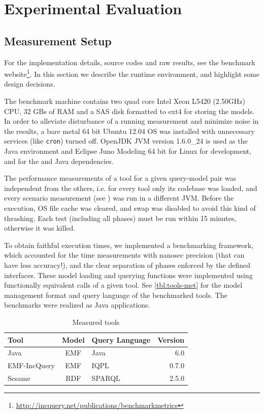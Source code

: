 \section{Experimental Evaluation}
\label{sec:eval}
% 

\subsection{Measurement Setup}

For the implementation details, source codes and raw results, see the
benchmark website\footnote{\url{http://incquery.net/publications/benchmarkmetrics}}. In this
section we describe the runtime environment, and highlight some design
decisions.

The benchmark machine contains two quad core Intel Xeon L5420 (2.50GHz) CPU, 32
GBs of RAM and a SAS disk formatted to ext4 for storing the models. In order to
alleviate disturbance of a running measurement and minimize noise in the results,
a bare metal 64 bit Ubuntu 12.04 OS was installed with unnecessary services
(like \texttt{cron}) turned off. OpenJDK JVM version 1.6.0\_24 is used as the Java
environment and Eclipse Juno Modeling 64 bit for Linux for development, and for
the \incquery{} and Java dependencies.

The performance measurements of a tool for a given query-model pair
was independent from the others, i.e. for every tool only its codebase was
loaded, and every scenario measurement (see ) was run
in a different JVM. Before the execution, OS file cache was cleared, and swap
was disabled to avoid this kind of thrashing. Each test (including all phases)
must be run within 15 minutes, otherwise it was killed.

To obtain faithful execution times, we implemented a benchmarking framework,
which accounted for the time measurements with nanosec precision (that can have
less accuracy!), and the clear separation of phases enforced by the defined
interfaces. These model loading and querying functions were implemented using
functionally equivalent calls of a given tool. See \autoref{tbl:tools-met} for
the model management format and query language of the benchmarked tools. The
benchmarks were realized as Java applications.

\begin{table}[h]
	\centering
	\footnotesize
	\begin{tabular}{ | l | c | l | r | }
	\hline 
	\textbf{Tool} & \textbf{Model} & \textbf{Query Language} & \textbf{Version} \\ \hline
	Java & EMF & Java & 6.0 \\ \hline
	EMF-IncQuery & EMF & IQPL & 0.7.0 \\ \hline
	Sesame & RDF & SPARQL & 2.5.0 \\ \hline
	\end{tabular}
	\caption{Measured tools}
	\label{tbl:tools-met}
\end{table}

